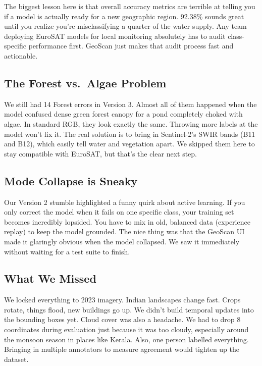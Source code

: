 \documentclass[journal]{IEEEtran}
\begin{document}
The biggest lesson here is that overall accuracy metrics are terrible at
telling you if a model is actually ready for a new geographic region.
92.38\% sounds great until you realize you're misclassifying a quarter
of the water supply. Any team deploying EuroSAT models for local
monitoring absolutely has to audit class-specific performance first.
GeoScan just makes that audit process fast and actionable.

\subsection{The Forest vs.\ Algae Problem}

We still had 14 Forest errors in Version 3. Almost all of them happened
when the model confused dense green forest canopy for a pond completely
choked with algae. In standard RGB, they look exactly the same. Throwing
more labels at the model won't fix it. The real solution is to bring in
Sentinel-2's SWIR bands (B11 and B12), which easily tell water and
vegetation apart. We skipped them here to stay compatible with EuroSAT,
but that's the clear next step.

\subsection{Mode Collapse is Sneaky}

Our Version 2 stumble highlighted a funny quirk about active learning.
If you only correct the model when it fails on one specific class, your
training set becomes incredibly lopsided. You have to mix in old,
balanced data (experience replay) to keep the model grounded. The nice
thing was that the GeoScan UI made it glaringly obvious when the model
collapsed. We saw it immediately without waiting for a test suite to
finish.

\subsection{What We Missed}

We locked everything to 2023 imagery. Indian landscapes change fast.
Crops rotate, things flood, new buildings go up. We didn't build
temporal updates into the bounding boxes yet. Cloud cover was also a
headache. We had to drop 8 coordinates during evaluation just because it
was too cloudy, especially around the monsoon season in places like
Kerala. Also, one person labelled everything. Bringing in multiple
annotators to measure agreement would tighten up the dataset.
\end{document}
